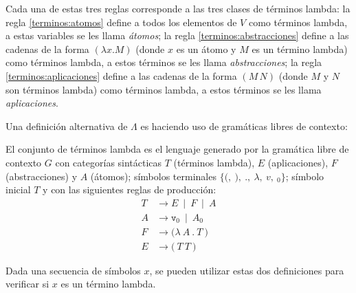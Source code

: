 Cada una de estas tres reglas corresponde a las tres clases de términos lambda: la regla \eqref{terminos:atomos} define a todos los elementos de \( V \) como términos lambda, a estas variables se les llama \emph{átomos}; la regla \eqref{terminos:abstracciones} define a las cadenas de la forma \( (λx.M) \) (donde \( x \) es un átomo y \( M \) es un término lambda) como términos lambda, a estos términos se les llama \emph{abstracciones}; la regla \eqref{terminos:aplicaciones} define a las cadenas de la forma \( (M\, N) \) (donde \( M \) y \( N \) son términos lambda) como términos lambda, a estos términos se les llama \emph{aplicaciones}.

Una definición alternativa de \( Λ \) es haciendo uso de gramáticas libres de contexto:

\begin{defn}
  El conjunto de términos lambda es el lenguaje generado por la gramática libre de contexto \( G \) con categorías sintácticas \( T \) (términos lambda), \( E \) (aplicaciones), \( F \) (abstracciones) y \( A \) (átomos); símbolos terminales \( \{\mathtt{(},\ \mathtt{)},\ \mathtt{.},\ λ,\ v,\ {}_{0}\} \); símbolo inicial \( T \) y con las siguientes reglas de producción:
  \label{defn:terminos-cfg}
  \begin{subequations}
    \begin{align}
      \label{terminos-cfg:terminos} \tag{a}
      T & \rightarrow E\ \mid\ F\ \mid\ A \\
      \label{terminos-cfg:atomos} \tag{b}
      A & \rightarrow \mathtt{v}_{0}\ \mid\ A {}_{0} \\
      \label{terminos-cfg:abstracciones} \tag{c}
      F & \rightarrow \mathtt{(} λ\ A\ \mathtt{.}\ T\ \mathtt{)} \\
      \label{terminos-cfg:aplicaciones} \tag{d}
      E & \rightarrow \mathtt{(}\ T\ T\ \mathtt{)}
    \end{align}
  \end{subequations}
\end{defn}

Dada una secuencia de símbolos \( x \), se pueden utilizar estas dos definiciones para verificar si \( x \) es un término lambda.

